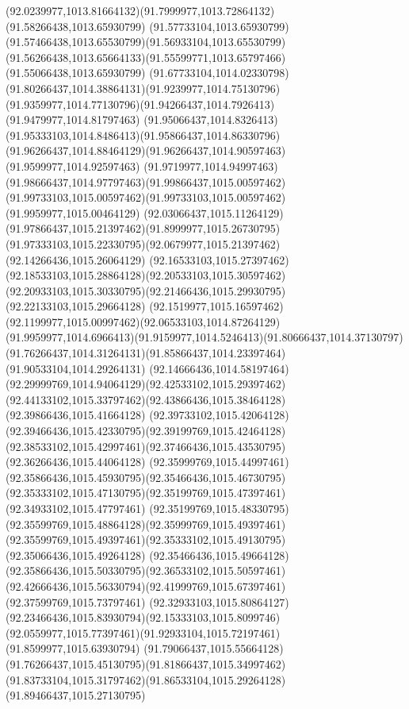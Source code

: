 {{\curveto(92.0239977,1013.81664132)(91.7999977,1013.72864132)(91.58266438,1013.65930799)
\curveto(91.57733104,1013.65930799)(91.57466438,1013.65530799)(91.56933104,1013.65530799)
\curveto(91.56266438,1013.65664133)(91.55599771,1013.65797466)(91.55066438,1013.65930799)
\curveto(91.67733104,1014.02330798)(91.80266437,1014.38864131)(91.9239977,1014.75130796)
\curveto(91.9359977,1014.77130796)(91.94266437,1014.7926413)(91.9479977,1014.81797463)
\curveto(91.95066437,1014.8326413)(91.95333103,1014.8486413)(91.95866437,1014.86330796)
\curveto(91.96266437,1014.88464129)(91.96266437,1014.90597463)(91.9599977,1014.92597463)
\curveto(91.9719977,1014.94997463)(91.98666437,1014.97797463)(91.99866437,1015.00597462)
\curveto(91.99733103,1015.00597462)(91.99733103,1015.00597462)(91.9959977,1015.00464129)
\curveto(92.03066437,1015.11264129)(91.97866437,1015.21397462)(91.8999977,1015.26730795)
\curveto(91.97333103,1015.22330795)(92.0679977,1015.21397462)(92.14266436,1015.26064129)
\curveto(92.16533103,1015.27397462)(92.18533103,1015.28864128)(92.20533103,1015.30597462)
\curveto(92.20933103,1015.30330795)(92.21466436,1015.29930795)(92.22133103,1015.29664128)
\curveto(92.1519977,1015.16597462)(92.1199977,1015.00997462)(92.06533103,1014.87264129)
\curveto(91.9959977,1014.6966413)(91.9159977,1014.5246413)(91.80666437,1014.37130797)
\curveto(91.76266437,1014.31264131)(91.85866437,1014.23397464)(91.90533104,1014.29264131)
\curveto(92.14666436,1014.58197464)(92.29999769,1014.94064129)(92.42533102,1015.29397462)
\curveto(92.44133102,1015.33797462)(92.43866436,1015.38464128)(92.39866436,1015.41664128)
\curveto(92.39733102,1015.42064128)(92.39466436,1015.42330795)(92.39199769,1015.42464128)
\curveto(92.38533102,1015.42997461)(92.37466436,1015.43530795)(92.36266436,1015.44064128)
\curveto(92.35999769,1015.44997461)(92.35866436,1015.45930795)(92.35466436,1015.46730795)
\curveto(92.35333102,1015.47130795)(92.35199769,1015.47397461)(92.34933102,1015.47797461)
\curveto(92.35199769,1015.48330795)(92.35599769,1015.48864128)(92.35999769,1015.49397461)
\curveto(92.35599769,1015.49397461)(92.35333102,1015.49130795)(92.35066436,1015.49264128)
\curveto(92.35466436,1015.49664128)(92.35866436,1015.50330795)(92.36533102,1015.50597461)
\curveto(92.42666436,1015.56330794)(92.41999769,1015.67397461)(92.37599769,1015.73797461)
\curveto(92.32933103,1015.80864127)(92.23466436,1015.83930794)(92.15333103,1015.8099746)
\curveto(92.0559977,1015.77397461)(91.92933104,1015.72197461)(91.8599977,1015.63930794)
\curveto(91.79066437,1015.55664128)(91.76266437,1015.45130795)(91.81866437,1015.34997462)
\curveto(91.83733104,1015.31797462)(91.86533104,1015.29264128)(91.89466437,1015.27130795)
}}
